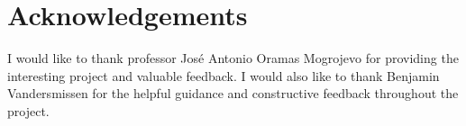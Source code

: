 \chapter*{Acknowledgements}

I would like to thank professor José Antonio Oramas Mogrojevo for providing the interesting project and valuable feedback. I would also like to thank Benjamin Vandersmissen for the helpful guidance and constructive feedback throughout the project.
